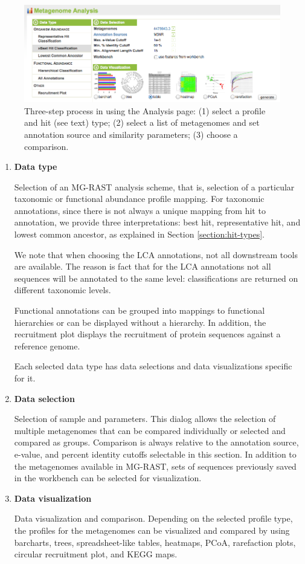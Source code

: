 \documentclass[12pt,fullpage]{report}
\begin{document}
\begin{figure}
\begin{center}
\includegraphics[width=6in]{Images/analysis-page.png}
\end{center}
\caption{
Three-step process in using the Analysis page: (1) select a profile and hit (see text) type; (2) select a list of metagenomes and set annotation source and similarity parameters; (3) choose a comparison.
}
\label{fig:analysis-page}
\end{figure}
\begin{enumerate}

\item \textbf{Data type}

Selection of an MG-RAST analysis scheme, that is, selection of a particular taxonomic or functional abundance profile mapping. For taxonomic annotations, since there is not always a unique mapping from hit to annotation, we provide three interpretations: best hit, representative hit, and lowest common ancestor, as explained in Section \ref{section:hit-types}.

We note that when choosing the LCA annotations, not all downstream tools are available. The reason is fact that for the LCA annotations not all sequences will be annotated to the same level: classifications are returned on different taxonomic levels.

Functional annotations can be grouped into mappings to functional hierarchies or can be displayed without a hierarchy. In addition, the recruitment plot displays the recruitment of protein sequences against a reference genome.

Each selected data type has data selections and data visualizations specific for it.


\item \textbf{Data selection}

Selection of sample and parameters. This dialog allows the selection of multiple metagenomes that can be compared individually or selected and compared as groups. Comparison is always relative to the annotation source, e-value, and percent identity cutoffs selectable in this section. In addition to the metagenomes available in MG-RAST, sets of sequences previously saved in the workbench can be selected for visualization.

\item \textbf{Data visualization}

Data visualization and comparison. Depending on the selected profile type, the profiles for the metagenomes can be visualized and compared by using barcharts, trees, spreadsheet-like tables, heatmaps, PCoA, rarefaction plots, circular recruitment plot, and KEGG maps.
\end{enumerate}
\end{document}
